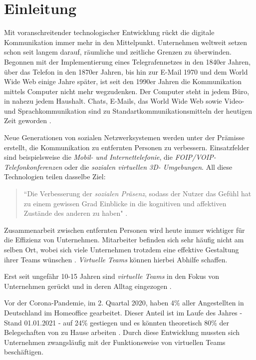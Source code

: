 \documentclass[a4paper,11pt]{article}%
\renewcommand{\\}{\vspace*{0.5\baselineskip} \newline}
\begin{document}
\section*{Einleitung}
	Mit voranschreitender technologischer Entwicklung rückt die digitale Kommunikation immer mehr in den Mittelpunkt. Unternehmen weltweit setzen schon seit langem darauf, räumliche und zeitliche Grenzen zu überwinden. Begonnen mit der Implementierung eines Telegrafennetzes in den 1840er Jahren, über das Telefon in den 1870er Jahren, bis hin zur E-Mail 1970 und dem World Wide Web einige Jahre später, ist seit den 1990er Jahren die Kommunikation mittels Computer nicht mehr wegzudenken. Der Computer steht in jedem Büro, in nahezu jedem Haushalt. Chats, E-Mails, das World Wide Web sowie Video- und Sprachkommunikation sind zu Standartkommunikationsmitteln der heutigen Zeit geworden \citep[S. 14-16]{thurlow2004computer}.
	
Neue Generationen von sozialen Netzwerksystemen werden unter der Prämisse erstellt, die Kommunikation zu entfernten Personen zu verbessern.
Einsatzfelder sind beispielsweise die \textit{Mobil- und Internettelefonie}, die\textit{ FOIP/VOIP-Telefonkonferenzen} oder die \textit{sozialen virtuellen 3D- Umgebungen}.
All diese Technologien teilen dasselbe Ziel: 
\begin{quote}
``Die Verbesserung der \textit{sozialen Präsenz}, sodass der Nutzer das Gefühl hat zu einem gewissen Grad Einblicke in die kognitiven und affektiven Zustände des anderen zu haben" \citep[S. 3]{biocca2002defining}.
\end{quote}

Zusammenarbeit zwischen entfernten Personen wird heute immer wichtiger für die Effizienz von Unternehmen. Mitarbeiter befinden sich sehr häufig nicht am selben Ort, wobei sich viele Unternehmen trotzdem eine effektive Gestaltung ihrer Teams wünschen \citep[S. 791-792]{jarvenpaa1999communication}. \textit{Virtuelle Teams} können hierbei Abhilfe schaffen. 
	
Erst seit ungefähr 10-15 Jahren sind \textit{virtuelle Teams} in den Fokus von Unternehmen gerückt und in deren Alltag eingezogen \citep{gilson2015virtual}.

Vor der Corona-Pandemie, im 2. Quartal 2020, haben 4\% aller Angestellten in Deutschland im Homeoffice gearbeitet. Dieser Anteil ist im Laufe des Jahres - Stand 01.01.2021 - auf 24\% gestiegen und es könnten theoretisch 80\% der Belegschaften von zu Hause arbeiten \citep{statistaCorona2020}. Durch diese Entwicklung mussten sich Unternehmen zwangsläufig mit der Funktionsweise von virtuellen Teams beschäftigen.
\end{document}
